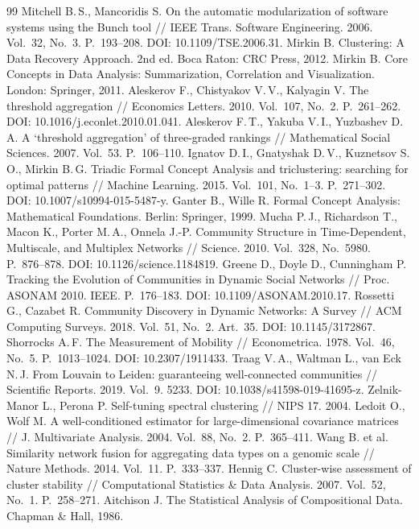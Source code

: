 \documentclass[11pt,a4paper]{article}
\begin{document}
\begin{thebibliography}{99}
 Mitchell B.\,S., Mancoridis S. On the automatic modularization of software systems using the Bunch tool // IEEE Trans. Software Engineering. 2006. Vol.~32, No.~3. P.~193--208. DOI: 10.1109/TSE.2006.31.
 Mirkin B. Clustering: A Data Recovery Approach. 2nd ed. Boca Raton: CRC Press, 2012.
 Mirkin B. Core Concepts in Data Analysis: Summarization, Correlation and Visualization. London: Springer, 2011.
 Aleskerov F., Chistyakov V.\,V., Kalyagin V. The threshold aggregation // Economics Letters. 2010. Vol.~107, No.~2. P.~261--262. DOI: 10.1016/j.econlet.2010.01.041.
 Aleskerov F.\,T., Yakuba V.\,I., Yuzbashev D.\,A. A `threshold aggregation' of three-graded rankings // Mathematical Social Sciences. 2007. Vol.~53. P.~106--110.
 Ignatov D.\,I., Gnatyshak D.\,V., Kuznetsov S.\,O., Mirkin B.\,G. Triadic Formal Concept Analysis and triclustering: searching for optimal patterns // Machine Learning. 2015. Vol.~101, No.~1--3. P.~271--302. DOI: 10.1007/s10994-015-5487-y.
 Ganter B., Wille R. Formal Concept Analysis: Mathematical Foundations. Berlin: Springer, 1999.
 Mucha P.\,J., Richardson T., Macon K., Porter M.\,A., Onnela J.-P. Community Structure in Time-Dependent, Multiscale, and Multiplex Networks // Science. 2010. Vol.~328, No.~5980. P.~876--878. DOI: 10.1126/science.1184819.
 Greene D., Doyle D., Cunningham P. Tracking the Evolution of Communities in Dynamic Social Networks // Proc. ASONAM 2010. IEEE. P.~176--183. DOI: 10.1109/ASONAM.2010.17.
 Rossetti G., Cazabet R. Community Discovery in Dynamic Networks: A Survey // ACM Computing Surveys. 2018. Vol.~51, No.~2. Art.~35. DOI: 10.1145/3172867.
 Shorrocks A.\,F. The Measurement of Mobility // Econometrica. 1978. Vol.~46, No.~5. P.~1013--1024. DOI: 10.2307/1911433.
 Traag V.\,A., Waltman L., van Eck N.\,J. From Louvain to Leiden: guaranteeing well-connected communities // Scientific Reports. 2019. Vol.~9. 5233. DOI: 10.1038/s41598-019-41695-z.
 Zelnik-Manor L., Perona P. Self-tuning spectral clustering // NIPS 17. 2004.
 Ledoit O., Wolf M. A well-conditioned estimator for large-dimensional covariance matrices // J. Multivariate Analysis. 2004. Vol.~88, No.~2. P.~365--411.
 Wang B. et al. Similarity network fusion for aggregating data types on a genomic scale // Nature Methods. 2014. Vol.~11. P.~333--337.
 Hennig C. Cluster-wise assessment of cluster stability // Computational Statistics \& Data Analysis. 2007. Vol.~52, No.~1. P.~258--271.
 Aitchison J. The Statistical Analysis of Compositional Data. Chapman \& Hall, 1986.
\end{thebibliography}
\end{document}
